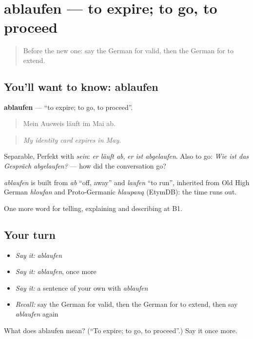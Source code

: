 \section[ablaufen]{ablaufen — to expire; to go, to proceed}

\label{lesson:GE-C384-ablaufen}



\begin{quote}
Before the new one: say the German for valid, then the German for to extend.
\end{quote}

\subsection*{You'll want to know: ablaufen}
\textbf{ablaufen} — \textquotedblleft{}to expire; to go, to proceed\textquotedblright{}.

\begin{quote}
Mein Ausweis läuft im Mai ab.
\end{quote}

\begin{quote}
\emph{My identity card expires in May.}
\end{quote}

Separable, Perfekt with \emph{sein}: \emph{er läuft ab}, \emph{er ist abgelaufen}. Also to go: \emph{Wie ist das Gespräch abgelaufen?} — how did the conversation go?

\begin{cousinweb}
\emph{ablaufen} is built from \emph{ab} \textquotedblleft{}off, away\textquotedblright{} and \emph{laufen} \textquotedblleft{}to run\textquotedblright{}, inherited from Old High German \emph{hloufan} and Proto-Germanic \emph{hlaupaną} (EtymDB): the time runs out.
\end{cousinweb}

\begin{grammarlens}[title={What you've built}]
One more word for telling, explaining and describing at B1.
\end{grammarlens}

\subsection*{Your turn}
\begin{itemize}
\raggedright
  \item \emph{Say it:} \emph{ablaufen}
  \item \emph{Say it:} \emph{ablaufen}, once more
  \item \emph{Say it:} a sentence of your own with \emph{ablaufen}
  \item \emph{Recall:} say the German for valid, then the German for to extend, then say \emph{ablaufen} again
\end{itemize}

\begin{tcolorbox}[breakable,colback=teal!4,colframe=teal!35!black,title={Before you move on}]
What does ablaufen mean? (\textquotedblleft{}To expire; to go, to proceed\textquotedblright{}.) Say it once more.
\end{tcolorbox}
